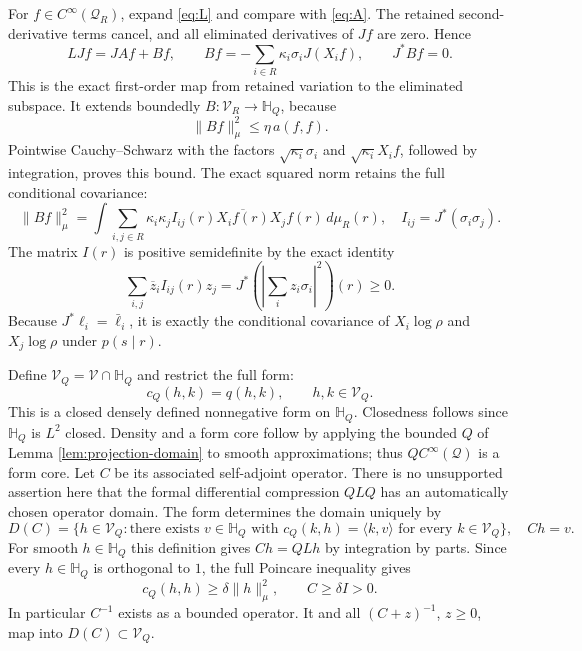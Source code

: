 \documentclass[11pt]{article}
\begin{document}
For $f\in C^\infty(\mathcal Q_R)$, expand \eqref{eq:L} and compare
with \eqref{eq:A}. The retained second-derivative terms cancel, and
all eliminated derivatives of $Jf$ are zero. Hence
\begin{equation}\label{eq:B}
 LJf=JAf+Bf,\qquad
 Bf=-\sum_{i\in R}\kappa_i\sigma_i J(X_if),\qquad J^*Bf=0.
\end{equation}
This is the exact first-order map from retained variation to the
eliminated subspace. It extends boundedly
$B:\mathcal V_R\to\mathbb H_Q$, because
\begin{equation}\label{eq:Bbound}
 \|Bf\|_\mu^2\leq\eta\,a(f,f).
\end{equation}
Pointwise Cauchy--Schwarz with the factors $\sqrt{\kappa_i}\sigma_i$
and $\sqrt{\kappa_i}X_if$, followed by integration, proves this bound.
The exact squared norm retains the full conditional covariance:
\begin{equation}\label{eq:Fisher}
 \|Bf\|_\mu^2
 =\int\sum_{i,j\in R}\kappa_i\kappa_j
       I_{ij}(r)\overline{X_if(r)}X_jf(r)\,d\mu_R(r),
 \quad I_{ij}=J^*(\sigma_i\sigma_j).
\end{equation}
The matrix $I(r)$ is positive semidefinite by the exact identity
\[
 \sum_{i,j}\overline z_i I_{ij}(r)z_j
 =J^*\left(\left|\sum_i z_i\sigma_i\right|^2\right)(r)\geq0.
\]
Because $J^*\ell_i=\bar\ell_i$, it is exactly the conditional covariance
of $X_i\log\rho$ and $X_j\log\rho$ under $p(s\mid r)$.

Define $\mathcal V_Q=\mathcal V\cap\mathbb H_Q$ and restrict the
full form:
\begin{equation}\label{eq:Cform}
 c_Q(h,k)=q(h,k),\qquad h,k\in\mathcal V_Q.
\end{equation}
This is a closed densely defined nonnegative form on $\mathbb H_Q$.
Closedness follows since $\mathbb H_Q$ is $L^2$ closed. Density and a
form core follow by applying the bounded $Q$ of Lemma
\ref{lem:projection-domain} to smooth approximations; thus
$Q C^\infty(\mathcal Q)$ is a form core. Let $C$ be its associated
self-adjoint operator. There is no unsupported assertion here that
the formal differential compression $QLQ$ has an automatically chosen
operator domain. The form determines the domain uniquely by
\[
 D(C)=\{h\in\mathcal V_Q:\text{there exists }v\in\mathbb H_Q
       \text{ with }c_Q(k,h)=\langle k,v\rangle
       \text{ for every }k\in\mathcal V_Q\},\quad Ch=v.
\]
For smooth $h\in\mathbb H_Q$ this definition gives $Ch=QLh$ by
integration by parts. Since every $h\in\mathbb H_Q$ is orthogonal to
$1$, the full Poincare inequality gives
\begin{equation}\label{eq:Cgap}
 c_Q(h,h)\geq\delta\|h\|_\mu^2,
 \qquad C\geq\delta I>0.
\end{equation}
In particular $C^{-1}$ exists as a bounded operator. It and all
$(C+z)^{-1}$, $z\geq0$, map into $D(C)\subset\mathcal V_Q$.
\end{document}
